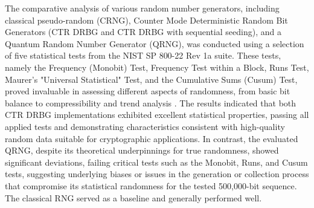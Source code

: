 The comparative analysis of various random number generators, including classical pseudo-random (CRNG), Counter Mode Deterministic Random Bit Generators (CTR DRBG and CTR DRBG with sequential seeding), and a Quantum Random Number Generator (QRNG), was conducted using a selection of five statistical tests from the NIST SP 800-22 Rev 1a suite. These tests, namely the Frequency (Monobit) Test, Frequency Test within a Block, Runs Test, Maurer's "Universal Statistical" Test, and the Cumulative Sums (Cusum) Test, proved invaluable in assessing different aspects of randomness, from basic bit balance to compressibility and trend analysis . The results indicated that both CTR DRBG implementations exhibited excellent statistical properties, passing all applied tests and demonstrating characteristics consistent with high-quality random data suitable for cryptographic applications. In contrast, the evaluated QRNG, despite its theoretical underpinnings for true randomness, showed significant deviations, failing critical tests such as the Monobit, Runs, and Cusum tests, suggesting underlying biases or issues in the generation or collection process that compromise its statistical randomness for the tested 500,000-bit sequence. The classical RNG served as a baseline and generally performed well.

